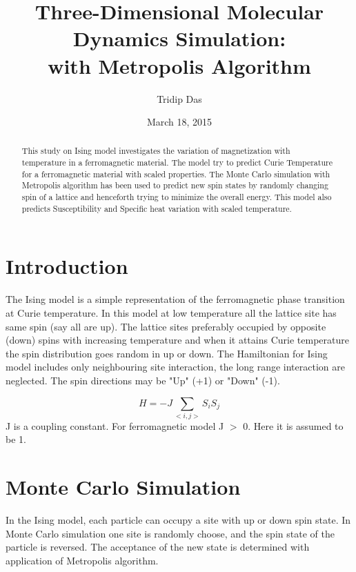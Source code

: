 \documentclass[]{article}
\begin{document}
\title{Three-Dimensional Molecular Dynamics Simulation:\\with Metropolis Algorithm}%
\author{Tridip Das}
\date{March 18, 2015}%
\maketitle

\begin{abstract}
This study on Ising model investigates the variation of magnetization with temperature in a ferromagnetic material.
The model try to predict Curie Temperature for a ferromagnetic material with scaled properties. The Monte Carlo simulation with Metropolis algorithm has been
used to predict new spin states by randomly changing spin of a lattice and henceforth trying to minimize the overall energy.
This model also predicts Susceptibility and Specific heat variation with scaled temperature.
\end{abstract}

\section{Introduction} %
\label{sec:level1} %

The Ising model is a simple representation of the ferromagnetic phase transition at Curie temperature. In this model at low temperature all the lattice site has same spin (say all are up).
The lattice sites preferably occupied by opposite (down) spins with increasing temperature and when it attains Curie temperature the spin distribution goes random in up or down.
The Hamiltonian for Ising model includes only neighbouring site interaction, the long range interaction are neglected. The spin directions may be "Up" (+1) or "Down" (-1).

\begin{equation}
\label{eq:one} %
  H = - J \sum_{<i,j>} S_i S_j
\end{equation}
J is a coupling constant. For ferromagnetic model J $>$ 0. Here it is assumed to be 1.

\section{Monte Carlo Simulation}
In the Ising model, each particle can occupy a site with up or down spin state. In Monte Carlo simulation one site is randomly choose, and the spin state of the particle is reversed.
The acceptance of the new state is determined with application of Metropolis algorithm.
\end{document}

